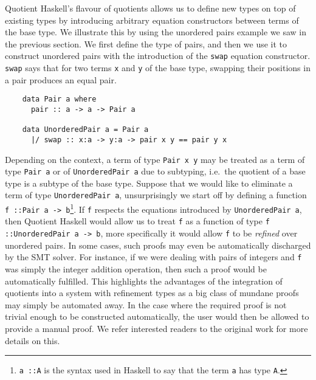 \documentclass[12pt,twoside,maitrise]{dms}
\theoremstyle{definition}
\numberwithin{equation}{section}
\numberwithin{table}{chapter}
\numberwithin{figure}{chapter}
\newcommand\id[1] {\texttt{#1}}
\newcommand\fn[1] {\texttt{#1}}
\newcommand\latinphrase{\textit}
\begin{document}
Quotient Haskell's flavour of quotients allows us to define new types on top of
existing types by introducing arbitrary equation constructors between terms of
the base type. We illustrate this by using the unordered pairs example we saw in
the previous section. We first define the type of pairs, and
then we use it to construct unordered pairs with the introduction of the
\id{swap} equation constructor. \id{swap} says that for two terms \id{x} and
\id{y} of the base type, swapping their positions in a pair produces an equal
pair.

\begin{verbatim}
    data Pair a where
      pair :: a -> a -> Pair a

    data UnorderedPair a = Pair a
      |/ swap :: x:a -> y:a -> pair x y == pair y x
\end{verbatim}

Depending on the context, a term of type \fn{Pair x y} may be treated as a term
of type \fn{Pair a} or of \fn{UnorderedPair a} due to subtyping, i.e.\ the
quotient of a base type is a subtype of the base type. Suppose that we would
like to eliminate a term of type \fn{UnorderedPair a}, unsurprisingly we start
off by defining a function \fn{f ::\@ Pair a -> b}\footnote{\fn{a ::\@ A} is the
syntax used in Haskell to say that the term \id{a} has type \id{A}.}. If \id{f}
respects the equations introduced by \fn{UnorderedPair a}, then Quotient Haskell
would allow us to treat \id{f} as a function of type \fn{f ::\@ UnorderedPair a
  -> b}, more specifically it would allow \id{f} to be \emph{refined} over
unordered pairs. In some cases, such proofs may even be automatically discharged
by the SMT solver. For instance, if we were dealing with pairs of integers and
\id{f} was simply the integer addition operation, then such a proof would be
automatically fulfilled. This highlights the advantages of the integration of
quotients into a system with refinement types as a big class of mundane proofs
may simply be automated away. In the case where the required proof is not
trivial enough to be constructed automatically, the user would then be allowed
to provide a manual proof. We refer interested readers to the original work for
more details on this.

\end{document}
